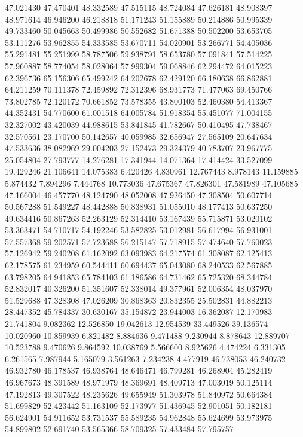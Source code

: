 47.021430
47.470401
48.332589
47.515115
48.724084
47.626181
48.908397
48.971614
46.946200
46.218818
51.171243
51.155889
50.214886
50.995339
49.733460
50.045663
50.499986
50.552682
51.671388
50.502200
53.653705
53.111276
53.962855
54.333585
53.670711
54.020901
53.266771
54.405036
55.291481
55.251999
58.787506
59.938791
58.653780
57.091841
57.514225
57.960887
58.774054
58.028064
57.999304
59.068846
62.294472
64.015223
62.396736
65.156306
65.499242
64.202678
62.429120
66.180638
66.862881
64.211259
70.111378
72.459892
72.312396
68.931773
71.477063
69.450766
73.802785
72.120172
70.661852
73.578355
43.800103
52.460380
54.413367
44.352431
54.770600
61.001518
64.005784
51.918354
55.451077
71.004155
32.327002
43.420039
44.988615
53.841845
41.782667
50.410495
47.738467
32.570561
23.170700
50.142657
40.059985
32.656947
27.565109
20.647634
47.533636
38.082969
29.004203
27.152473
29.324379
40.783707
23.967775
25.054804
27.793777
14.276281
17.341944
14.071364
17.414424
33.527099
19.429246
21.106641
14.075383
6.420426
4.830961
12.767443
8.978143
11.159885
5.874432
7.894296
7.444768
10.773036
47.675367
47.826301
47.581989
47.105685
47.166004
46.457770
48.124790
48.052008
47.926450
47.308504
50.607714
50.567288
51.549227
48.442888
50.838931
51.055010
48.177413
50.637250
49.634416
50.867263
52.263129
52.314410
53.167439
55.715871
53.020102
53.363471
54.710717
54.192246
53.582825
53.012981
56.617994
56.931001
57.557368
59.202571
57.723688
56.215147
57.718915
57.474640
57.760023
57.126942
59.240208
61.162092
63.093983
64.217574
61.308087
62.125413
62.178575
61.234959
60.544411
60.694437
65.043080
68.240533
62.567885
63.798205
64.941853
65.784103
61.186586
64.731462
65.725320
68.344784
52.832017
40.326200
51.351607
52.338014
49.377961
52.006354
48.037970
51.529688
47.328308
47.026209
30.868363
20.832355
25.502831
44.882213
28.447352
45.784337
30.630167
35.154872
23.944003
16.362087
12.170983
21.741804
9.082362
12.526850
19.042613
12.954539
33.449526
39.136574
10.020960
10.859939
6.821482
8.884636
9.471488
9.230944
8.878643
12.889707
10.523788
9.470626
9.864592
10.038769
5.566600
8.925626
4.474224
6.331305
6.261565
7.987944
5.165079
3.561263
7.234238
4.477919
46.738053
46.240732
46.932780
46.178537
46.938764
48.646471
46.799281
46.268904
45.282419
46.967673
48.391589
48.971979
48.369691
48.409713
47.003019
50.125114
47.192813
49.307522
48.235626
49.655949
51.303978
51.840972
50.664384
51.699829
52.423442
51.163109
52.173977
51.436945
52.901051
50.182181
56.624901
54.911652
53.731537
55.589235
54.962848
55.624699
53.973975
54.899802
52.691740
53.565366
58.709325
57.433484
57.795757
